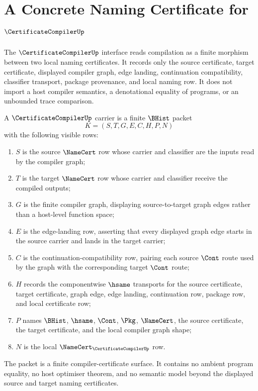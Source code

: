 \chapter{A Concrete Naming Certificate for $\CertificateCompilerUp$}
\label{ch:concrete-instances-certificatecompiler-namecert}

The $\CertificateCompilerUp$ interface reads compilation as a finite morphism
between two local naming certificates. It records only the source certificate,
target certificate, displayed compiler graph, edge landing, continuation
compatibility, classifier transport, package provenance, and local naming row.
It does not import a host compiler semantics, a denotational equality of
programs, or an unbounded trace comparison.

\begin{definition}
\label{def:certificate-compiler-carrier}
A $\CertificateCompilerUp$ carrier is a finite $\BHist$ packet
$$
K=(S,T,G,E,C,H,P,N)
$$
with the following visible rows:
\begin{enumerate}
\item $S$ is the source $\NameCert$ row whose carrier and classifier are the
inputs read by the compiler graph;
\item $T$ is the target $\NameCert$ row whose carrier and classifier receive
the compiled outputs;
\item $G$ is the finite compiler graph, displaying source-to-target graph
edges rather than a host-level function space;
\item $E$ is the edge-landing row, asserting that every displayed graph edge
starts in the source carrier and lands in the target carrier;
\item $C$ is the continuation-compatibility row, pairing each source
$\Cont$ route used by the graph with the corresponding target $\Cont$ route;
\item $H$ records the componentwise $\hsame$ transports for the source
certificate, target certificate, graph edge, edge landing, continuation row,
package row, and local certificate row;
\item $P$ names $\BHist$, $\hsame$, $\Cont$, $\Pkg$, $\NameCert$, the source
certificate, the target certificate, and the local compiler graph shape;
\item $N$ is the local $\NameCert_{\CertificateCompilerUp}$ row.
\end{enumerate}
The packet is a finite compiler-certificate surface. It contains no ambient
program equality, no host optimiser theorem, and no semantic model beyond the
displayed source and target naming certificates.
\end{definition}

